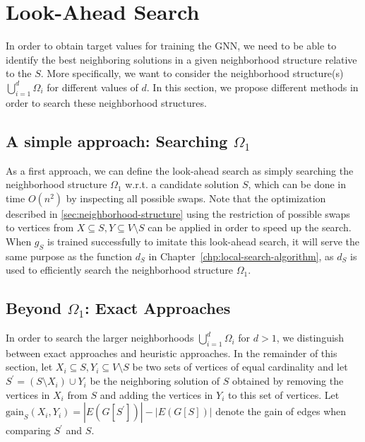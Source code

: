 \documentclass[draft,final]{vutinfth} %
\begin{document}
\section{Look-Ahead Search}\label{sec:lookahead-search}

In order to obtain target values for training the GNN, we need to be able to identify the best neighboring solutions in a given neighborhood structure relative to the $S$. More specifically, we want to consider the neighborhood structure(s) $\bigcup_{i=1}^d \Omega_i$ for different values of $d$. In this section, we propose different methods in order to search these neighborhood structures. 

\subsection{A simple approach: Searching $\Omega_1$}

As a first approach, we can define the look-ahead search as simply searching the neighborhood structure $\Omega_1$ w.r.t. a candidate solution $S$, which can be done in time $O(n^2)$ by inspecting all possible swaps. Note that the optimization described in \ref{sec:neighborhood-structure} using the restriction of possible swaps to vertices from $X \subseteq S, Y \subseteq V \setminus S$ can be applied in order to speed up the search. 
When $g_S$ is trained successfully to imitate this look-ahead search, it will serve the same purpose as the function $d_S$ in Chapter~\ref{chp:local-search-algorithm}, as $d_S$ is used to efficiently search the neighborhood structure $\Omega_1$. 

\subsection{Beyond $\Omega_1$: Exact Approaches}

In order to search the larger neighborhoods $\bigcup_{i=1}^d \Omega_i$ for $d > 1$, we distinguish between exact approaches and heuristic approaches. 
In the remainder of this section, let $X_i \subseteq S, Y_i \subseteq V\setminus S$ be two sets of vertices of equal cardinality and let $S^\prime = (S \setminus X_i) \cup Y_i$ be the neighboring solution of $S$ obtained by removing the vertices in $X_i$ from $S$ and adding the vertices in $Y_i$ to this set of vertices. Let $\mathrm{gain}_S(X_i, Y_i) = |E(G[S^\prime])| - |E(G[S])|$ denote the gain of edges when comparing $S^\prime$ and $S$.   
\end{document}
